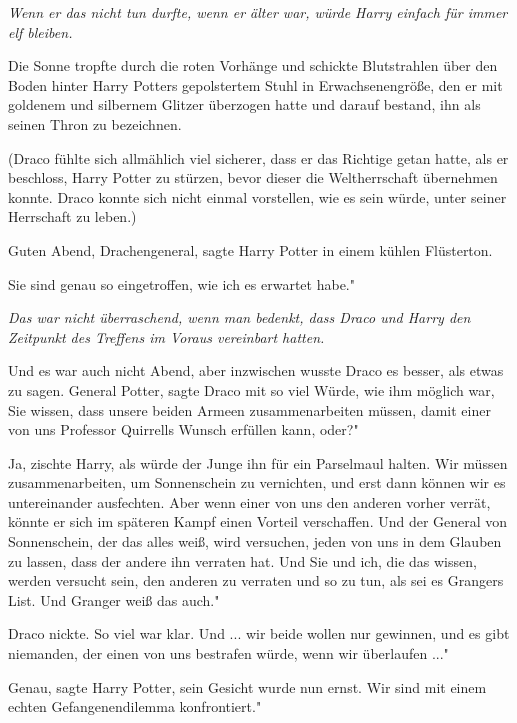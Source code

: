 \emph{Wenn er das nicht tun durfte, wenn er älter war, würde Harry einfach für
immer elf bleiben.}

Die Sonne tropfte durch die roten Vorhänge und schickte Blutstrahlen über den
Boden hinter Harry Potters gepolstertem Stuhl in Erwachsenengröße, den er mit
goldenem und silbernem Glitzer überzogen hatte und darauf bestand, ihn als
seinen Thron zu bezeichnen.

(Draco fühlte sich allmählich viel sicherer, dass er das Richtige getan hatte,
als er beschloss, Harry Potter zu stürzen, bevor dieser die Weltherrschaft
übernehmen konnte. Draco konnte sich nicht einmal vorstellen, wie es sein würde,
unter seiner Herrschaft zu leben.)

\glqq Guten Abend, Drachengeneral\grqq{}, sagte Harry Potter in einem kühlen
Flüsterton.

\glqq Sie sind genau so eingetroffen, wie ich es erwartet habe."

\emph{Das war nicht überraschend, wenn man bedenkt, dass Draco und Harry den
Zeitpunkt des Treffens im Voraus vereinbart hatten.}

Und es war auch nicht Abend, aber inzwischen wusste Draco es besser, als etwas
zu sagen. \glqq General Potter\grqq{}, sagte Draco mit so viel Würde, wie ihm
möglich war, \glqq Sie wissen, dass unsere beiden Armeen zusammenarbeiten
müssen, damit einer von uns Professor Quirrells Wunsch erfüllen kann, oder?"

\glqq Ja\grqq{}, zischte Harry, als würde der Junge ihn für ein Parselmaul
halten. \glqq Wir müssen zusammenarbeiten, um Sonnenschein zu vernichten, und
erst dann können wir es untereinander ausfechten. Aber wenn einer von uns den
anderen vorher verrät, könnte er sich im späteren Kampf einen Vorteil
verschaffen. Und der General von Sonnenschein, der das alles weiß, wird
versuchen, jeden von uns in dem Glauben zu lassen, dass der andere ihn verraten
hat. Und Sie und ich, die das wissen, werden versucht sein, den anderen zu
verraten und so zu tun, als sei es Grangers List. Und Granger weiß das auch."

Draco nickte. So viel war klar. \glqq Und ... wir beide wollen nur gewinnen, und
es gibt niemanden, der einen von uns bestrafen würde, wenn wir überlaufen ..."

\glqq Genau\grqq{}, sagte Harry Potter, sein Gesicht wurde nun ernst. \glqq Wir
sind mit einem echten Gefangenendilemma konfrontiert."

